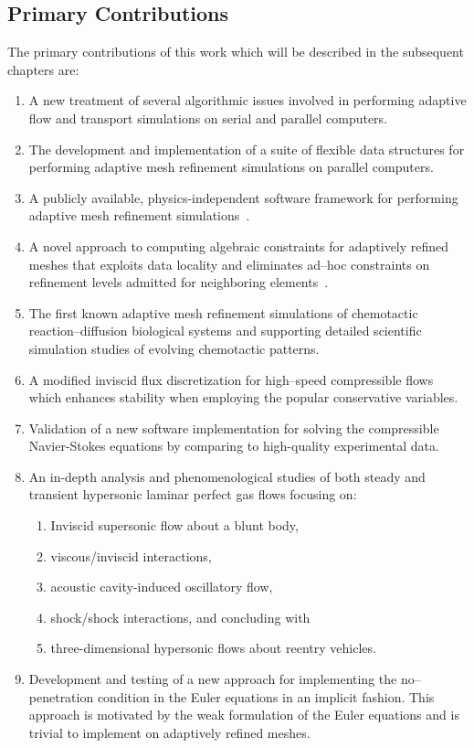 \subsection{Primary Contributions}
The primary contributions of this work which will be described in the subsequent chapters are:
\begin{enumerate}
  \tightlist
  \item A new treatment of several algorithmic issues involved in performing adaptive flow and transport simulations on serial and parallel computers.
  \item The development and implementation of a suite of flexible data structures for performing adaptive mesh refinement simulations on parallel computers.
  \item A publicly available, physics-independent software framework for performing adaptive mesh refinement simulations~\cite{libMeshPaper}.
  \item A novel approach to computing algebraic constraints for adaptively refined meshes that exploits data locality and eliminates ad--hoc constraints on refinement levels admitted for neighboring elements~\cite{libMeshPaper}.
  \item The first known adaptive mesh refinement simulations of chemotactic reaction--diffusion biological systems and supporting detailed scientific simulation studies of evolving chemotactic patterns.
  \item A modified inviscid flux discretization for high--speed compressible flows which enhances stability when employing the popular conservative variables.
  \item Validation of a new software implementation for solving the compressible Navier-Stokes equations by comparing to high-quality experimental data.
  \item An in-depth analysis and phenomenological studies of both steady and transient hypersonic laminar perfect gas flows focusing on:
    \begin{enumerate}
      \tightlist
      \item Inviscid supersonic flow about a blunt body,
      \item viscous/inviscid interactions,
      \item acoustic cavity-induced oscillatory flow,
      \item shock/shock interactions, and concluding with
      \item three-dimensional hypersonic flows about reentry vehicles.
    \end{enumerate}
  \item Development and testing of a new approach for implementing the no--penetration condition in the Euler equations in an implicit fashion.  This approach is motivated by the weak formulation of the Euler equations and is trivial to implement on adaptively refined meshes.
\end{enumerate}

